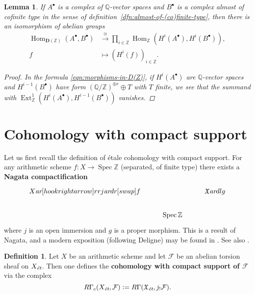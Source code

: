 \documentclass[leqno,12pt]{article}
\theoremstyle{plain}
\newtheorem{lemma}[theorem]{\indent\sc Lemma}
\theoremstyle{definition}
\newtheorem{definition}[theorem]{\indent\sc Definition}
\DeclareMathOperator{\Spec}{Spec}
\DeclareMathOperator{\Hom}{Hom}
\DeclareMathOperator{\Ext}{Ext}
\newcommand{\QQ}{\mathbb{Q}}
\newcommand{\ZZ}{\mathbb{Z}}
\newcommand{\dfn}{\mathrel{\mathop:}=}
\newcommand{\ar}{\text{\it ar}}
\newcommand{\et}{\text{\it \'{e}t}}
\begin{document}
\begin{lemma}
  \label{lemma:morphisms-in-DAb-between-cplx-of-Q-vs-and-almost-cofinite-type-cplx}
  If $A^\bullet$ is a complex of $\QQ$-vector spaces and $B^\bullet$ is a
  complex almost of cofinite type in the sense of
  definition~{\rm\ref{dfn:almost-of-(co)finite-type}}, then there is an isomorphism
  of abelian groups
  \begin{align*}
    \Hom_{\mathbf{D} (\ZZ)} (A^\bullet, B^\bullet) & \xrightarrow{\cong}
    \prod_{i\in \ZZ} \Hom_\ZZ (H^i (A^\bullet), H^i (B^\bullet)),\\
    f & \mapsto (H^i (f))_{i\in \ZZ}.
  \end{align*}

  \begin{proof}
    In the formula \eqref{eqn:morphisms-in-D(Z)}, if $H^i (A^\bullet)$ are
    $\QQ$-vector spaces and $H^{i-1} (B^\bullet)$ have form
    $(\QQ/\ZZ)^{\oplus r} \oplus T$ with $T$ finite, we see that the summand with
    $\Ext_\ZZ^1 (H^i (A^\bullet), H^{i-1} (B^\bullet))$ vanishes.
  \end{proof}
\end{lemma}


\section{Cohomology with compact support}
\label{app:modified-cohomology-with-compact-support}

Let us first recall the definition of \'{e}tale cohomology with compact support.
For any arithmetic scheme $f\colon X\to \Spec \ZZ$ (separated, of finite type)
there exists a \textbf{Nagata compactification}
\[ \begin{tikzcd}
X \ar[hookrightarrow]{rr}{j}\ar{dr}[swap]{f} & & \mathfrak{X} \ar{dl}{g} \\
 & \Spec \ZZ
\end{tikzcd} \]
where $j$ is an open immersion and $g$ is a proper morphism. This is a result of
Nagata, and a modern exposition (following Deligne) may be found in
\cite{Conrad-Deligne-Nagata,Conrad-Deligne-Nagata-erratum}. See also
\cite[Expos\'{e}~XVII]{SGA4}.

\begin{definition}
  Let $X$ be an arithmetic scheme and let $\mathcal{F}$ be an abelian torsion
  sheaf on $X_\et$. Then one defines the
  \textbf{cohomology with compact support of $\mathcal{F}$} via the complex
  \begin{equation}
    \label{eqn:RGammac-via-extension-by-zero}
    R\Gamma_c (X_\et, \mathcal{F}) \dfn
    R\Gamma (\mathfrak{X}_\text{\it \'et}, j_! \mathcal{F}).
  \end{equation}
\end{definition}
\end{document}
